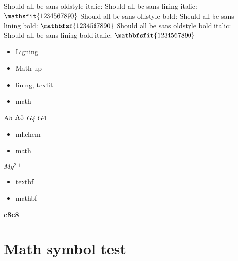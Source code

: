 {  Should all be sans oldstyle italic:\newline
  \textsf{\textit{\y}}\newline
  Should all be sans lining italic:\newline
  \textsf{\lining\textit{\y}}\newline
  $\mathsfit{\y}$\newline
  Should all be sans oldstyle bold:\newline
  \textbf{\textsf{\y}}\newline
  Should all be sans lining bold:\newline
  \textbf{\textsf{\lining\y}} \newline
  $\mathbfsf{\y}$\newline
  Should all be sans oldstyle bold italic:\newline
  \textbf{\textsf{\textit{\y}}}\newline
  Should all be sans lining bold italic:\newline
  \textbf{\textsf{\lining\textit{\y}}} \newline
  $\mathbfsfit{\y}$\newline
}

\tightlists
\begin{itemize}
\item Ligning
\item Math up
\item lining, textit
\item math
\end{itemize}

{\lining A5} $\textup{A5}$ {\lining \textit{G4}} $G4$

\begin{itemize}
\item mhchem
\item math
\end{itemize}

$Mg^{2+}$

\begin{itemize}
\item textbf
\item mathbf
\end{itemize}

\textbf{c8}$\mathbf{c8}$


\chapter{Math symbol test}

